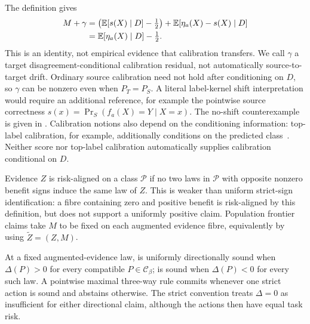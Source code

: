 \begin{remark}
\label{rem:gamma-residual}
The definition gives
\begin{align*}
M+\gamma
&=\bigl(\mathbb{E}[s(X)\mid D]-\tfrac12\bigr)
  +\mathbb{E}[\eta_a(X)-s(X)\mid D]\\
&=\mathbb{E}[\eta_a(X)\mid D]-\tfrac12.
\end{align*}
This is an identity, not empirical evidence that calibration transfers. We call $\gamma$ a
target disagreement-conditional calibration residual, not automatically source-to-target
drift. Ordinary source calibration need not hold after conditioning on $D$, so $\gamma$ can be
nonzero even when $P_T=P_S$. A literal label-kernel shift interpretation would require an
additional reference, for example the pointwise source correctness
$s(x)=\Pr_S(f_a(X)=Y\mid X=x)$. The no-shift counterexample is given in
.
Calibration notions also depend on the conditioning information: top-label calibration, for
example, additionally conditions on the predicted class~\cite{gupta2021toplabel}.
Neither score nor top-label calibration automatically supplies calibration conditional on $D$.
\end{remark}

\begin{definition}
\label{def:risk-align}
Evidence $Z$ is risk-aligned on a class $\mathcal P$ if no two laws in $\mathcal P$ with opposite
nonzero benefit signs induce the same law of $Z$. This is weaker than uniform strict-sign
identification: a fibre containing zero and positive benefit is risk-aligned by this definition,
but does not support a uniformly positive claim. Population frontier claims take $M$ to be fixed on each
augmented evidence fibre, equivalently by using $\widetilde Z=(Z,M)$.
\end{definition}

\begin{definition}
\label{def:strict-sound}
At a fixed augmented-evidence law, \adapt is uniformly directionally sound when $\Delta(P)>0$ for
every compatible $P\in\mathcal C_\beta$; \freeze is sound when $\Delta(P)<0$ for every such law.
A pointwise maximal three-way rule commits whenever one strict action is sound and abstains
otherwise. The strict convention treats $\Delta=0$ as insufficient for either directional claim,
although the actions then have equal task risk.
\end{definition}

